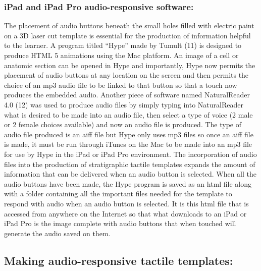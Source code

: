 \documentclass[11.5pt]{sig-alternate} %
\begin{document}
\begin{large}
\subsubsection*{iPad and iPad Pro audio-responsive software:}

The placement of audio buttons beneath the small holes filled with electric paint on a 3D laser cut template is essential for the production of information helpful to the learner.  A program titled “Hype” made by Tumult (11) is designed to produce HTML 5 animations using the Mac platform.  An image of a cell or anatomic section can be opened in Hype and importantly, Hype now permits the placement of audio buttons at any location on the screen and then permits the choice of an mp3 audio file to be linked to that button so that a touch now produces the embedded audio.  Another piece of software named NaturalReader 4.0 (12) was used to produce audio files by simply typing into NaturalReader what is desired to be made into an audio file, then select a type of voice (2 male or 2 female choices available) and now an audio file is produced.  The type of audio file produced is an aiff file but Hype only uses mp3 files so once an aiff file is made, it must be run through iTunes on the Mac to be made into an mp3 file for use by Hype in the iPad or iPad Pro environment.  The incorporation of audio files into the production of stratigraphic tactile templates expands the amount of information that can be delivered when an audio button is selected.  When all the audio buttons have been made, the Hype program is saved as an html file along with a folder containing all the important files needed for the template to respond with audio when an audio button is selected.  It is this html file that is accessed from anywhere on the Internet so that what downloads to an iPad or iPad Pro is the image complete with audio buttons that when touched will generate the audio saved on them.
      
\subsection*{Making audio-responsive tactile templates:}


\end{large}
\end{document}
